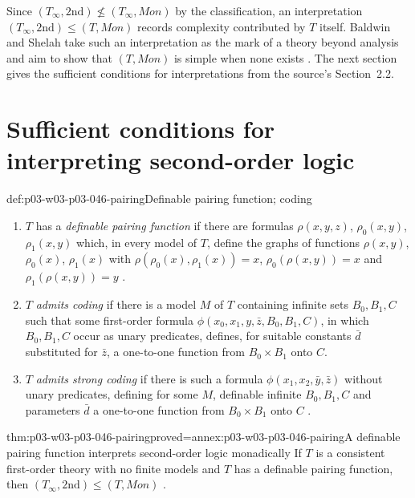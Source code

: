 Since \((T_\infty,\mathrm{2nd})\not\le(T_\infty,\mathit{Mon})\) by the
classification, an interpretation \((T_\infty,\mathrm{2nd})\le(T,\mathit{Mon})\)
records complexity contributed by \(T\) itself. Baldwin and Shelah take
such an interpretation as the mark of a theory beyond analysis and aim to
show that \((T,\mathit{Mon})\) is simple when none exists
\cite[p.~242]{BaldwinShelah1985}. The next section gives the sufficient
conditions for interpretations from the source's Section~2.2.

\section{Sufficient conditions for interpreting second-order logic}
\label{sec:p03-w03-p03-046-sufficient}

\begin{hbdefinition}{def:p03-w03-p03-046-pairing}{Definable pairing function; coding}
\begin{enumerate}
  \item \(T\) has a \emph{definable pairing function} if there are
        formulas \(\rho(x,y,z)\), \(\rho_0(x,y)\), \(\rho_1(x,y)\) which, in
        every model of \(T\), define the graphs of functions \(\rho(x,y)\),
        \(\rho_0(x)\), \(\rho_1(x)\) with
        \(\rho(\rho_0(x),\rho_1(x))=x\), \(\rho_0(\rho(x,y))=x\) and
        \(\rho_1(\rho(x,y))=y\)
        \cite[p.~242, Definition~2.2.1]{BaldwinShelah1985}.
  \item \(T\) \emph{admits coding} if there is a model \(M\) of \(T\)
        containing infinite sets \(B_0,B_1,C\) such that some first-order
        formula \(\phi(x_0,x_1,y,\bar z,B_0,B_1,C)\), in which
        \(B_0,B_1,C\) occur as unary predicates, defines, for suitable
        constants \(\bar d\) substituted for \(\bar z\), a one-to-one
        function from \(B_0\times B_1\) onto \(C\).
  \item \(T\) \emph{admits strong coding} if there is such a formula
        \(\phi(x_1,x_2,\bar y,\bar z)\) without unary predicates, defining for
        some \(M\), definable infinite \(B_0,B_1,C\) and parameters \(\bar d\)
        a one-to-one function from \(B_0\times B_1\) onto \(C\)
        \cite[pp.~242--243, Definition~2.2.3]{BaldwinShelah1985}.
\end{enumerate}
\end{hbdefinition}

\begin{hblemma}{thm:p03-w03-p03-046-pairing}{proved=annex:p03-w03-p03-046-pairing}{A definable pairing function interprets second-order logic monadically}
If \(T\) is a consistent first-order theory with no finite models and
\(T\) has a definable pairing function, then
\((T_\infty,\mathrm{2nd})\le(T,\mathit{Mon})\)
\cite[p.~242, Lemma~2.2.2]{BaldwinShelah1985}.
\end{hblemma}

